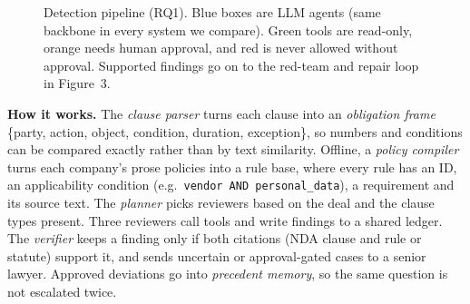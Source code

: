 \documentclass[11pt,a4paper]{article}
\begin{document}
\begin{figure}[H]
{}
\caption{Detection pipeline (RQ1). Blue boxes are LLM agents (same backbone in every system we compare). Green tools are read-only, orange needs human approval, and red is never allowed without approval. Supported findings go on to the red-team and repair loop in Figure~3.}
\end{figure}

\textbf{How it works.} The \emph{clause parser} turns each clause into an \emph{obligation frame} \{party, action, object, condition, duration, exception\}, so numbers and conditions can be compared exactly rather than by text similarity. Offline, a \emph{policy compiler} turns each company's prose policies into a rule base, where every rule has an ID, an applicability condition (e.g.\ \texttt{vendor AND personal\_data}), a requirement and its source text. The \emph{planner} picks reviewers based on the deal and the clause types present. Three reviewers call tools and write findings to a shared ledger. The \emph{verifier} keeps a finding only if both citations (NDA clause and rule or statute) support it, and sends uncertain or approval-gated cases to a senior lawyer. Approved deviations go into \emph{precedent memory}, so the same question is not escalated twice.
\end{document}
